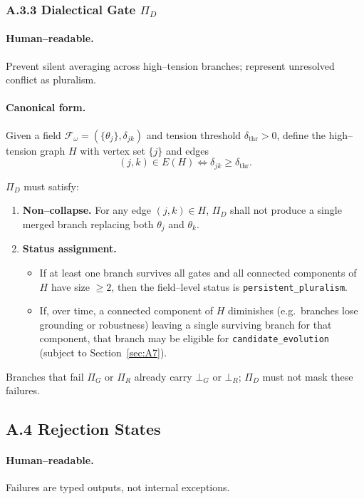 \documentclass[11pt, a4paper]{article}
\begin{document}
\subsubsection*{A.3.3 \quad Dialectical Gate $\Pi_D$}

\paragraph{Human–readable.}
Prevent silent averaging across high–tension branches; represent unresolved conflict as pluralism.

\paragraph{Canonical form.}
Given a field $\mathcal{F}_\omega = (\{\theta_j\}, \delta_{jk})$ and tension threshold $\delta_{\mathrm{thr}} > 0$, define the high–tension graph $H$ with vertex set $\{j\}$ and edges
\[
(j,k) \in E(H) \iff \delta_{jk} \ge \delta_{\mathrm{thr}}.
\]

$\Pi_D$ must satisfy:

\begin{enumerate}[label=(\roman*)]
  \item \textbf{Non–collapse.} For any edge $(j,k) \in H$, $\Pi_D$ shall not produce a single merged branch replacing both $\theta_j$ and $\theta_k$.
  \item \textbf{Status assignment.}
  \begin{itemize}
    \item If at least one branch survives all gates and all connected components of $H$ have size $\ge 2$, then the field–level status is \texttt{persistent\_pluralism}.
    \item If, over time, a connected component of $H$ diminishes (e.g.\ branches lose grounding or robustness) leaving a single surviving branch for that component, that branch may be eligible for \texttt{candidate\_evolution} (subject to Section~\ref{sec:A7}).
  \end{itemize}
\end{enumerate}

Branches that fail $\Pi_G$ or $\Pi_R$ already carry $\bot_G$ or $\bot_R$; $\Pi_D$ must not mask these failures.

\subsection*{A.4 \quad Rejection States}

\paragraph{Human–readable.}
Failures are typed outputs, not internal exceptions.
\end{document}
